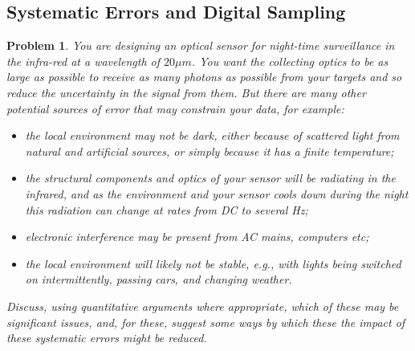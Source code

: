 \documentclass[a4paper]{article}
\theoremstyle{new}
\newtheorem{qns}{Problem}[section]
\begin{document}
\subsection{Systematic Errors and Digital Sampling}
\begin{qns}
You are designing an optical sensor for night-time surveillance in the infra-red at a wavelength of $20\mu m$. You want the collecting optics to be as large as possible to receive as many photons as possible from your targets and so reduce the uncertainty in the signal from them. But there are many other potential sources of error that may constrain your data, for example:
\begin{itemize}
    \item the local environment may not be dark, either because of scattered light from natural and artificial sources, or simply because it has a finite temperature; 
    \item the structural components and optics of your sensor will be radiating in the infrared, and as the environment and your sensor cools down during the night this radiation can change at rates from DC to several Hz;
    \item electronic interference may be present from AC mains, computers etc;
    \item the local environment will likely not be stable, e.g., with lights being switched on intermittently, passing cars, and changing weather.
\end{itemize}
Discuss, using quantitative arguments where appropriate, which of these may be significant issues, and, for these, suggest some ways by which these the impact of these systematic errors might be reduced.
\end{qns}
\end{document}
